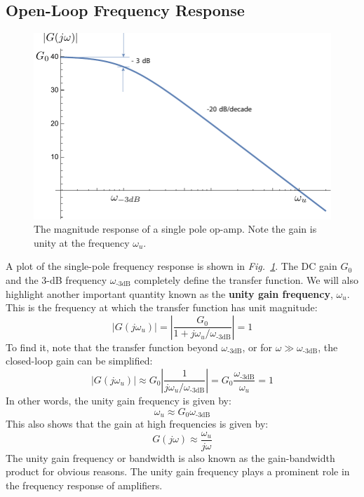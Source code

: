 \subsection{Open-Loop Frequency Response}
\begin{figure}[tb]
\centering
\includegraphics[width=.7\columnwidth]{mag1pole}
\caption{The magnitude response of a single pole op-amp.  Note the gain is unity at the frequency $\omega_u$.}
\label{fig:mag1pole}
\end{figure}
A plot of the single-pole frequency response is shown in \emph{Fig.~\ref{fig:mag1pole}}.  The DC gain $G_0$ and the 3-dB frequency $\omega_{\text{-3dB}}$ completely define the transfer function.  We will also highlight another important quantity known as the \textbf{unity gain frequency}, $\omega_u$.  This is the frequency at which the transfer function has unit magnitude:
    \begin{equation}
        |G(j\omega_u )| = \left| \frac{G_0}{1 + j\omega_u/\omega_{\text{-3dB}}} \right| = 1
    \end{equation}
To find it, note that the transfer function beyond $\omega_{\text{-3dB}}$, or for $\omega \gg \omega_{\text{-3dB}}$, the closed-loop gain can be simplified:
    \begin{equation}
        |G(j\omega_u )| \approx G_0 \left| \frac{1}{j\omega_u/\omega_{\text{-3dB}}} \right| = G_0 \frac{\omega_{\text{-3dB}}}{\omega_u} = 1 
    \end{equation}
In other words, the unity gain frequency is given by:
    \begin{equation}
        \omega_u \approx G_0 \omega_{\text{-3dB}}
    \end{equation}  
This also shows that the gain at high frequencies is given by:
    \begin{equation}
        G(j\omega ) \approx \frac{{{\omega_u}}}{{j\omega }}
    \end{equation}
The unity gain frequency or bandwidth is also known as the gain-bandwidth product for obvious reasons.   The unity gain frequency plays a prominent role in the frequency response of amplifiers.
